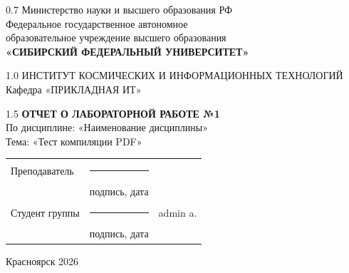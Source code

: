 \begin{titlepage}
	\begin{center}
		\begin{spacing}{0.7}
		Министерство науки и высшего образования РФ\\
		{\small Федеральное государственное автономное}\\
		{\small образовательное учреждение высшего образования}\\
		\textbf{\small«СИБИРСКИЙ ФЕДЕРАЛЬНЫЙ УНИВЕРСИТЕТ»}\\
		\end{spacing}
		
		\vfill
		
		\begin{spacing}{1.0}
		ИНСТИТУТ КОСМИЧЕСКИХ И ИНФОРМАЦИОННЫХ ТЕХНОЛОГИЙ\\
		Кафедра «ПРИКЛАДНАЯ ИТ»\\
		\end{spacing}
		
		\vfill
		\vfill
		
		\begin{spacing}{1.5}
			\textbf{\large ОТЧЕТ О ЛАБОРАТОРНОЙ РАБОТЕ №1}\\[5mm]
			По дисциплине: «Наименование дисциплины»\\[3mm]
			Тема: «Тест компиляции PDF»
		\end{spacing}
    \end{center}		

	\vfill
	\vfill
	
\noindent
\begin{tabular}{@{} p{} p{} p{} @{}}
	Преподаватель    & \rule{3.5cm}{.1pt} &   \\
	                 & {\scriptsize подпись, дата} & \\ [4ex]
	Студент группы   & \rule{3.5cm}{.1pt} & admin a. \\
	 & {\scriptsize подпись, дата} & \\
\end{tabular}

\vfill
\begin{center}Красноярск 2026\end{center}
\end{titlepage}
\restoregeometry